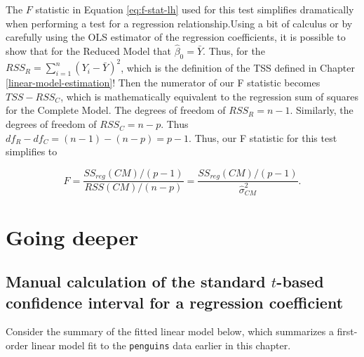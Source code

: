 \documentclass[
]{book}
\theoremstyle{definition}
\theoremstyle{definition}
\theoremstyle{definition}
\theoremstyle{definition}
\theoremstyle{remark}
\begin{document}
The \(F\) statistic in Equation \eqref{eq:f-stat-lh} used for this test simplifies dramatically when performing a test for a regression relationship.Using a bit of calculus or by carefully using the OLS estimator of the regression coefficients, it is possible to show that for the Reduced Model that \(\hat{\beta}_0=\bar{Y}\). Thus, for the \(RSS_R = \sum_{i=1}^n (Y_i - \bar{Y})^2\), which is the definition of the TSS defined in Chapter \ref{linear-model-estimation}! Then the numerator of our F statistic becomes \(TSS - RSS_C\), which is mathematically equivalent to the regression sum of squares for the Complete Model. The degrees of freedom of \(RSS_R = n - 1\). Similarly, the degrees of freedom of \(RSS_C = n - p\). Thus \(df_R - df_C = (n - 1) - (n - p) = p-1\). Thus, our F statistic for this test simplifies to

\[
F = \frac{SS_{reg}(CM)/(p-1)}{RSS(CM)/(n-p)}= \frac{SS_{reg}(CM)/(p-1)}{\hat{\sigma}^2_{CM}}.
\]

\hypertarget{going-deeper-2}{%
\section{Going deeper}\label{going-deeper-2}}

\hypertarget{manual-t-cis}{%
\subsection{\texorpdfstring{Manual calculation of the standard \(t\)-based confidence interval for a regression coefficient}{Manual calculation of the standard t-based confidence interval for a regression coefficient}}\label{manual-t-cis}}

Consider the summary of the fitted linear model below, which summarizes a first-order linear model fit to the \texttt{penguins} data earlier in this chapter.
\end{document}
